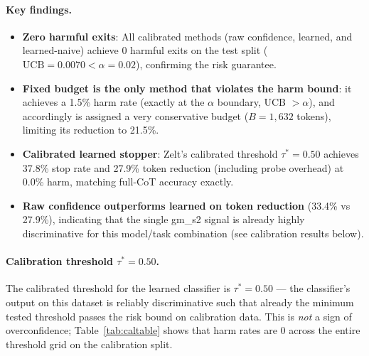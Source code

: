 \documentclass[11pt]{article}
\begin{document}
\paragraph{Key findings.}
\begin{itemize}
  \item \textbf{Zero harmful exits}: All calibrated methods (raw confidence,
        learned, and learned-naive) achieve 0 harmful exits on the test split
        ($\text{UCB} = 0.0070 < \alpha = 0.02$), confirming the risk guarantee.
  \item \textbf{Fixed budget is the only method that violates the harm bound}:
        it achieves a 1.5\% harm rate (exactly at the $\alpha$ boundary,
        UCB $> \alpha$), and accordingly is assigned a very conservative budget
        ($B=1{,}632$ tokens), limiting its reduction to 21.5\%.
  \item \textbf{Calibrated learned stopper}: Zelt's calibrated threshold
        $\tau^*=0.50$ achieves 37.8\% stop rate and 27.9\% token reduction
        (including probe overhead) at 0.0\% harm, matching full-CoT accuracy exactly.
  \item \textbf{Raw confidence outperforms learned on token reduction}
        (33.4\% vs 27.9\%), indicating that the single gm\_s2 signal is
        already highly discriminative for this model/task combination
        (see calibration results below).
\end{itemize}

\paragraph{Calibration threshold $\tau^*=0.50$.}
The calibrated threshold for the learned classifier is $\tau^*=0.50$ ---
the classifier's output on this dataset is reliably discriminative such that
already the minimum tested threshold passes the risk bound on calibration data.
This is \emph{not} a sign of overconfidence; Table~\ref{tab:caltable} shows
that harm rates are 0 across the entire threshold grid on the calibration split.
\end{document}
